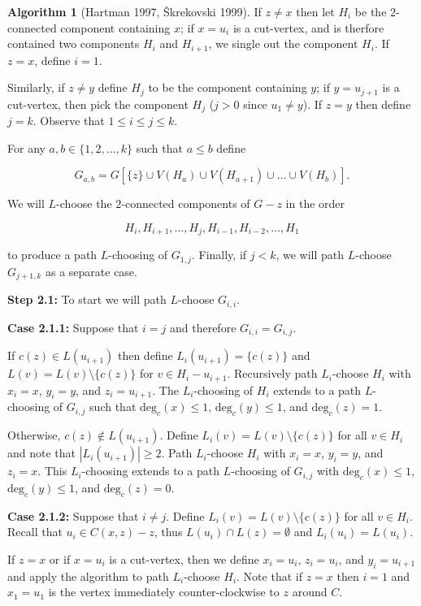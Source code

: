 \documentclass[12pt,letterpaper]{article}
\theoremstyle{plain}
\theoremstyle{definition}
\theoremstyle{break}
\newtheorem{algorithm}[lemma]{Algorithm}     %
\begin{document}
\begin{algorithm}[Hartman 1997, \v{S}krekovski 1999]
    If $z\ne x$ then let $H_i$ be the $2$-connected
    component containing $x$; if $x=u_i$ is a cut-vertex, and is therfore
    contained two components $H_i$ and $H_{i+1}$, we
    single out the component $H_i$.
    If $z=x$, define $i=1$.

    Similarly, if $z\ne y$ define $H_j$ to be the
    component containing $y$; if $y=u_{j+1}$ is a cut-vertex, then pick
    the component $H_j$ ($j>0$ since $u_1\ne y$).
    If $z = y$ then define $j=k$.
    Observe that $1\le i\le j\le k$.

    For any $a,b\in\{1,2,\ldots,k\}$ such that $a\le b$ define

    $$ G_{a,b}=G\left[\{z\}\cup V(H_a)\cup V(H_{a+1})\cup \ldots\cup V(H_b)\right].$$ 

    We will $L$-choose the $2$-connected components of $G-z$ in the order

    $$H_i,H_{i+1},\ldots,H_j,H_{i-1},H_{i-2},\ldots,H_1$$

    to produce a path $L$-choosing of $G_{1,j}$. Finally,
    if $j < k$, we will
    path $L$-choose $G_{j+1,k}$ as a separate case.

    \textbf{Step 2.1:} To start we will path $L$-choose $G_{i,i}$.

    \textbf{Case 2.1.1:} Suppose that $i=j$ and therefore
    $G_{i,i}=G_{i,j}$. 

    If $c(z)\in L(u_{i+1})$ then define
    $L_i(u_{i+1})=\{c(z)\}$ and $L(v)=L(v)\setminus\{c(z)\}$ for
    $v\in H_i-u_{i+1}$. Recursively path $L_i$-choose $H_i$ with $x_i=x$, $y_i=y$,
    and $z_i=u_{i+1}$. The $L_i$-choosing of $H_i$ extends to a path
    $L$-choosing of $G_{i,j}$ such that $\text{deg}_c(x)\le 1$,
    $\text{deg}_c(y)\le 1$, and $\text{deg}_c(z)=1$.

    Otherwise, $c(z)\not\in L(u_{i+1})$. Define $L_i(v)=L(v)\setminus\{c(z)\}$
    for all $v\in H_i$ and note that $|L_i(u_{i+1})|\ge 2$. Path
    $L_i$-choose $H_i$ with $x_i=x$, $y_i=y$, and $z_i=x$. This $L_i$-choosing
    extends to a path $L$-choosing of $G_{i,j}$ with
    $\text{deg}_c(x)\le 1$, $\text{deg}_c(y)\le 1$, and $\text{deg}_c(z)=0$.

    \textbf{Case 2.1.2:} Suppose that $i\ne j$.
    Define $L_i(v)=L(v)\setminus\{c(z)\}$ for all $v\in H_i$. Recall that
    $u_i\in C(x,z)-z$, thus $L(u_i)\cap L(z)=\emptyset$ and $L_i(u_i)=L(u_i)$. 

    If $z=x$ or if $x=u_i$ is a cut-vertex, then we
    define $x_i=u_i$, $z_i=u_i$, and $y_i=u_{i+1}$ and apply the algorithm
    to path $L_i$-choose $H_i$. Note that if $z=x$ then $i=1$ and $x_1=u_1$
    is the vertex immediately counter-clockwise to $z$ around $C$.


\end{algorithm}
\end{document}
